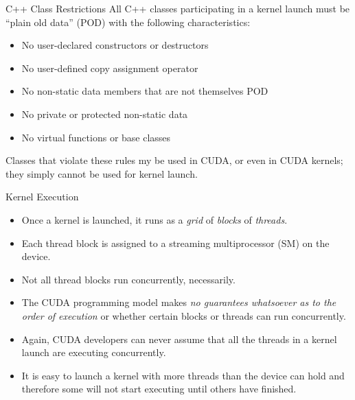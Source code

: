 \documentclass[handout]{beamer}
\begin{document}
\begin{frame}{{\selectfont C++} Class Restrictions}
All {\selectfont C++} classes participating in a kernel launch must be ``plain old data'' (POD) with the following characteristics:
\hfill\break
\begin{itemize}
\itemsep1em
	\item<1->No user-declared constructors or destructors
	\item<1->No user-defined copy assignment operator
	\item<1->No non-static data members that are not themselves POD
	\item<1->No private or protected non-static data
	\item<1->No virtual functions or base classes
\end{itemize}
\hfill \break
Classes that violate these rules my be used in CUDA, or even in CUDA kernels; they simply cannot be used for kernel launch.
\end{frame}


\begin{frame}{Kernel Execution}
\begin{itemize}
	\item<1->Once a kernel is launched, it runs as a \emph{grid} of \emph{blocks} of \emph{threads}.
	\item<1->Each thread block is assigned to a streaming multiprocessor (SM) on the device.
	\item<1->Not all thread blocks run concurrently, necessarily.
	\item<1->The CUDA programming model makes \emph{no guarantees whatsoever as to the order of execution} or whether certain blocks or threads can run concurrently.
	\item<1->Again, CUDA developers can never assume that all the threads in a kernel launch are executing concurrently.
	\item<1->It is easy to launch a kernel with more threads than the device can hold and therefore some will not start executing until others have finished.
\end{itemize}
\end{frame}
\end{document}
